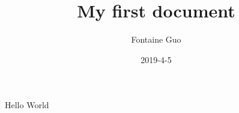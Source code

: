 \documentclass{article}
\title{My first document}
\date{2019-4-5}
\author{Fontaine Guo}
\begin{document}
    \maketitle
    \newpage
    Hello World
\end{document}
